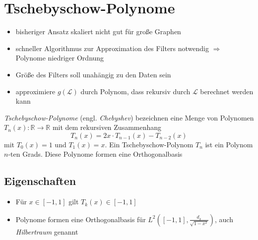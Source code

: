 \section{Tschebyschow-Polynome}

\begin{itemize}
  \item bisheriger Ansatz skaliert nicht gut für große Graphen
  \item schneller Algorithmus zur Approximation des Filters notwendig $\Rightarrow$ Polynome niedriger Ordnung
  \item Größe des Filters soll unahängig zu den Daten sein
  \item approximiere $g(\mathcal{L})$ durch Polynom, dass rekursiv durch $\mathcal{L}$ berechnet werden kann
\end{itemize}

\emph{Tschebyschow-Polynome} (engl. \emph{Chebyshev}) bezeichnen eine Menge von Polynomen $T_n(x) \colon \mathbb{R} \to \mathbb{R}$ mit dem rekursiven Zusammenhang
\begin{equation}
  T_n(x) = 2x \cdot T_{n-1}(x) - T_{n-2}(x)
\end{equation}
mit $T_0(x) = 1$ und $T_1(x) = x$.
Ein Tschebyschow-Polynom $T_n$ ist ein Polynom $n$-ten Grads.
Diese Polynome formen eine Orthogonalbasis

\subsection{Eigenschaften}

\begin{itemize}
  \item Für $x \in [-1, 1]$ gilt $T_k(x) \in [-1, 1]$
  \item Polynome formen eine Orthogonalbasis für $L^2 \left([-1, 1], \frac{d_x}{\sqrt{1-x^2}}\right)$, auch \emph{Hilbertraum} genannt
\end{itemize}
